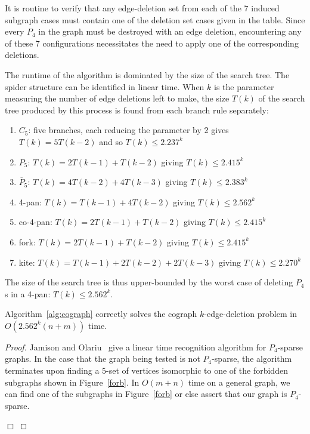 \documentclass{llncs}
\begin{document}
It is routine to verify that any edge-deletion set from each of the 7 induced subgraph cases must contain one of the deletion set cases given in the table. Since every $P_4$ in the graph must be destroyed with an edge deletion, encountering any of these 7 configurations necessitates the need to apply one of the corresponding deletions.

The runtime of the algorithm is dominated by the size of the search tree. The spider structure can be identified in linear time. When $k$ is the parameter measuring the number of edge deletions left to make, the size $T(k)$ of the search tree produced by this process is found from each branch rule separately:
\begin{enumerate}
  \item $C_5$: five branches, each reducing the parameter by 2 gives $T(k) = 5T(k-2)$ and so $T(k) \leq 2.237^k$
  \item $P_5$: $T(k) = 2T(k-1) + T(k-2)$ giving $T(k) \leq 2.415^k$
  \item $\overline{P}_5$: $T(k) = 4T(k-2) + 4T(k-3)$ giving $T(k) \leq 2.383^k$
  \item 4-pan: $T(k) = T(k-1) + 4T(k-2)$ giving $T(k) \leq 2.562^k$
  \item co-4-pan: $T(k) = 2T(k-1) + T(k-2)$ giving $T(k) \leq 2.415^k$
  \item fork: $T(k) = 2T(k-1) + T(k-2)$ giving $T(k) \leq 2.415^k$
  \item kite: $T(k) = T(k-1) + 2T(k-2) + 2T(k-3)$ giving $T(k) \leq 2.270^k$
\end{enumerate}

The size of the search tree is thus upper-bounded by the worst case of deleting $P_4$s in a 4-pan: $T(k) \leq 2.562^k$.

\begin{theorem}
Algorithm~\ref{alg:cograph} correctly solves the cograph $k$-edge-deletion problem in {$O(2.562^k(n+m))$} time.
\end{theorem}

\begin{proof}
Jamison and Olariu~\cite{JaOl} give a linear time recognition algorithm for $P_4$-sparse graphs. In the case that the graph being tested is not $P_4$-sparse, the algorithm terminates upon finding a 5-set of vertices isomorphic to one of the forbidden subgraphs shown in Figure~\ref{forb}. In $O(m+n)$ time on a general graph, we can find one of the subgraphs in Figure~\ref{forb} or else assert that our graph is $P_4$-sparse.

\hfill $\Box$
\end{proof}
\end{document}
